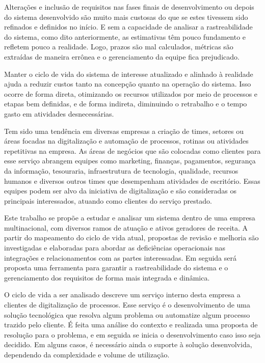 	Alterações e inclusão de requisitos nas fases finais de desenvolvimento ou depois 
	do sistema desenvolvido são muito mais custosas do que se estes tivessem sido 
	refinados e definidos no início. E sem a capacidade de analisar a rastreabilidade do 
	sistema, como dito anteriormente, as estimativas têm pouco fundamento e 
	refletem pouco a realidade. Logo, prazos são mal calculados, métricas são extraídas 
	de maneira errônea e o gerenciamento da equipe fica prejudicado. 

	Manter o ciclo de vida do sistema de interesse atualizado e alinhado à realidade 
	ajuda a reduzir custos tanto na concepção quanto na operação do sistema. Isso ocorre 
	de forma direta, otimizando os recursos utilizados por meio de processos e etapas bem 
	definidas, e de forma indireta, diminuindo o retrabalho e o tempo gasto em atividades desnecessárias.

	Tem sido uma tendência em diversas empresas a criação de times, setores ou áreas focadas na digitalização 
	e automação de processos, rotinas ou atividades repetitivas na empresa.
	As áreas de negócios {\color{blue}que são colocadas como clientes para esse serviço} abrangem equipes 
	como marketing, finanças, pagamentos, segurança da informação, tesouraria, infraestrutura de tecnologia, 
	qualidade, recursos humanos e diversos outros times que desempenham atividades de escritório. Essas equipes 
	podem ser alvo da iniciativa de digitalização e são consideradas os principais interessados, atuando como 
	clientes do serviço prestado.

	Este trabalho se propõe a estudar e analisar um sistema dentro de uma empresa multinacional, com 
	diversos ramos de atuação e ativos geradores de receita. A partir do mapeamento do ciclo de vida 
	atual, propostas de revisão e melhoria são investigadas e elaboradas para abordar as deficiências 
	operacionais nas integrações e relacionamentos com as partes interessadas. Em seguida será proposta 
	uma ferramenta para garantir a rastreabilidade do sistema e o gerenciamento dos requisitos de forma 
	mais integrada e dinâmica.
	
	O ciclo de vida a ser analisado descreve um serviço interno desta empresa a clientes de digitalização de processos. Esse serviço é o desenvolvimento de uma solução 
	tecnológica que resolva algum problema ou automatize algum processo trazido pelo 
	cliente. É feita uma análise do contexto e realizada uma proposta de resolução 
	para o problema, e em seguida se inicia o desenvolvimento caso isso seja decidido. 
	Em alguns casos, é necessário ainda o suporte à solução desenvolvida, dependendo 
	da complexidade e volume de utilização. 

